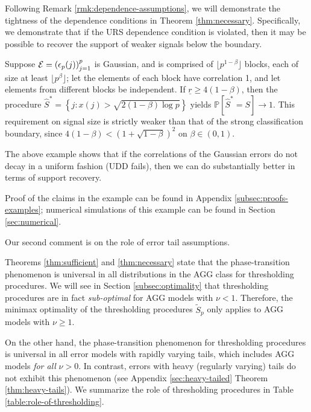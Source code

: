 Following Remark \ref{rmk:dependence-assumptions}, we will demonstrate the tightness of the dependence conditions in Theorem \ref{thm:necessary}.
Specifically, we demonstrate that if the URS dependence condition is violated, then it may be possible to recover the support of weaker signals below the boundary.

\begin{example} \label{exmp:counter-example}
Suppose ${\cal E} = \left(\epsilon_p(j)\right)_{j=1}^p$ is Gaussian, and is comprised of $\lfloor p^{1-\beta}\rfloor$ blocks, each of size at least $\lfloor p^\beta \rfloor$; 
let the elements of each block have correlation 1, and let elements from different blocks be independent. 
If $\underline{r} \ge 4(1-\beta)$, then the procedure $\widehat{S}^* = \left\{j:x(j)>\sqrt{2(1-\beta)\log{p}}\right\}$ yields $\mathbb P[\widehat{S}^* = S] \to 1$. 
This requirement on signal size is strictly weaker than that of the strong classification boundary, since $4(1-\beta) < (1 + \sqrt{1-\beta})^2$ on $\beta\in(0,1)$.

The above example shows that if the correlations of the Gaussian errors do not decay in a uniform fashion (UDD fails), then we can do substantially better in terms of support recovery.
\end{example} 

Proof of the claims in the example can be found in Appendix \ref{subsec:proofs-examples}; numerical simulations of this example can be found in Section \ref{sec:numerical}.

Our second comment is on the role of error tail assumptions.

\begin{remark} \label{rmk:tail-assumptions}
Theorems \ref{thm:sufficient} and \ref{thm:necessary} state that the phase-transition phenomenon is universal in all distributions in the AGG class for thresholding procedures.
We will see in Section \ref{subsec:optimality} that thresholding procedures are in fact \emph{sub-optimal} for AGG models with $\nu<1$. 
Therefore, the minimax optimality of the thresholding procedures $\widetilde{S}_p$ only applies to AGG models with $\nu\ge1$.

On the other hand, the phase-transition phenomenon for thresholding procedures is universal in all error models with rapidly varying tails, which includes AGG models {\it for all} $\nu>0$.
In contrast, errors with heavy (regularly varying) tails do not exhibit this phenomenon (see Appendix \ref{sec:heavy-tailed} Theorem \ref{thm:heavy-tails}).
We summarize the role of thresholding procedures in Table \ref{table:role-of-thresholding}.
\end{remark}


